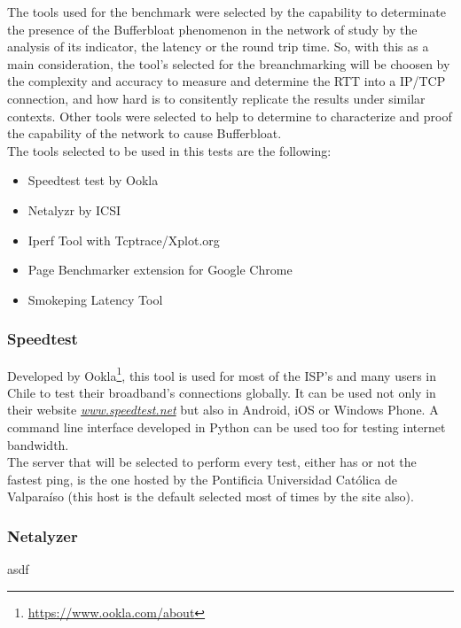 The tools used for the benchmark were selected by the capability to determinate 
the presence of the Bufferbloat phenomenon in the network of study by the 
analysis of its indicator, the latency or the round trip time. So, with this as 
 a main consideration, the tool's selected for the breanchmarking will be
choosen by the complexity and accuracy to measure and determine the RTT into a
IP/TCP connection, and how hard is to consitently replicate the results under 
similar contexts. Other tools were selected to help to determine to 
characterize and proof the capability of the network to cause Bufferbloat.\\

The tools selected to be used in this tests are the following:

\begin{itemize}
    \item Speedtest test by Ookla
    \item Netalyzr by ICSI
    \item Iperf Tool with Tcptrace/Xplot.org
    \item Page Benchmarker extension for Google Chrome
    \item Smokeping Latency Tool
\end{itemize}

\subsubsection{Speedtest}

Developed by Ookla\footnote{\url{https://www.ookla.com/about}}, this tool is used
for most of the ISP's and many users in Chile to test their broadband's
connections globally. It can be used not only in their website 
\href{http://www.speedtest.net}{\textit{www.speedtest.net}} but also in Android,
iOS or Windows Phone. A command line interface developed in Python can be used 
too for testing internet bandwidth.\\

The server that will be selected to perform every test, either has or not the
fastest ping, is the one hosted by the Pontificia Universidad Cat\'olica de
Valpara\'iso (this host is the default selected most of times by the site also).  

\subsubsection{Netalyzer\cite{netalyzr}}

asdf

